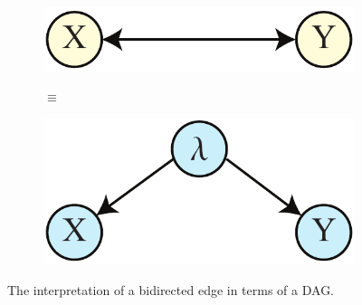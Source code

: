 \documentclass[letterpaper,onecolumn,nofootinbib]{revtex4}
\begin{document}
\begin{figure}[h]
        \begin{subfigure}[b]{0.2\textwidth}
                	\centering
                	\includegraphics[width=\textwidth]{XY-darrow}
                	\label{fig:XY-darrow}
        \end{subfigure}
                      \begin{subfigure}[b]{0.05\textwidth}
                	\centering
                	$\equiv$\vspace{2em}
        \end{subfigure}
        \begin{subfigure}[b]{0.2\textwidth}
                	\centering
                	\includegraphics[width=\textwidth]{XY-hvar}
                	\label{fig:XY-hvar}
        \end{subfigure}
        \caption{The interpretation of a bidirected edge in terms of a DAG.}
        \label{fig:XY-latentcause}
\end{figure}
\end{document}
